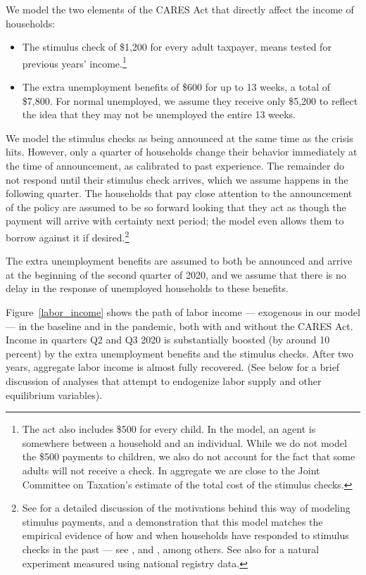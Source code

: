 \documentclass[titlepage,a4paper]{\econtex}
\begin{document}
We model the two elements of the CARES Act that directly affect the income of households:
\begin{itemize}
\item The stimulus check of \$1,200 for every adult taxpayer, means tested for previous years' income.\footnote{The act also includes \$500 for every child. In the model, an agent is somewhere between a household and an individual. While we do not model the \$500 payments to children, we also do not account for the fact that some adults will not receive a check. In aggregate we are close to the Joint Committee on Taxation's estimate of the total cost of the stimulus checks.}
\item The extra unemployment benefits of \$600 for up to 13 weeks, a total of \$7,800.
  For normal unemployed, we assume they receive only \$5,200 to reflect the idea that they may not be unemployed the entire 13 weeks.
\end{itemize}

We model the stimulus checks as being announced at the same time as the crisis hits.
However, only a quarter of households change their behavior immediately at the time of announcement, as calibrated to past experience.
The remainder do not respond until their stimulus check arrives, which we assume happens in the following quarter.
The households that pay close attention to the announcement of the policy are assumed to be so forward looking that they act as though the payment will arrive with certainty next period; the model even allows them to borrow against it if desired.\footnote{See \cite{carroll_sticky_2020} for a detailed discussion of the motivations behind this way of modeling stimulus payments, and a demonstration that this model matches the empirical evidence of how and when households have responded to stimulus checks in the past --- see \cite{psjmMPC2008}, \cite{brodaParker} and \cite{parker25million}, among others.  See also \cite{fhnMPC} for a natural experiment measured using national registry data.}

The extra unemployment benefits are assumed to both be announced and arrive at the beginning of the second quarter of 2020, and we assume that there is no delay in the response of unemployed households to these benefits.

Figure~\ref{labor_income} shows the path of labor income --- exogenous in our model --- in the baseline and in the pandemic, both with and without the CARES Act.
Income in quarters Q2 and Q3 2020 is substantially boosted (by around 10 percent) by the extra unemployment benefits and the stimulus checks.
After two years, aggregate labor income is almost fully recovered.  (See below for a brief discussion of analyses that attempt to endogenize labor supply and other equilibrium variables).
\end{document}
